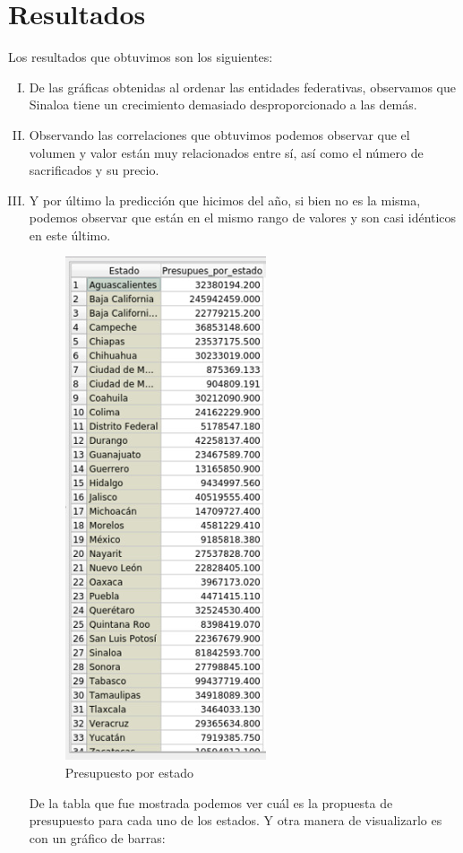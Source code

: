 \section*{Resultados}
Los resultados que obtuvimos son los siguientes:
\begin{enumerate}[I.]
    \item De las gráficas obtenidas al ordenar las entidades federativas, observamos que Sinaloa tiene un crecimiento demasiado desproporcionado a las demás.
    \item Observando las correlaciones que obtuvimos podemos observar que el volumen y valor están muy relacionados entre sí, así como el número de sacrificados y su precio. \newpage 
    \item Y por último la predicción que hicimos del año, si bien no es la misma, podemos observar que están en el mismo rango de valores y son casi idénticos en este último.
\begin{figure}[!h]
    \centering
    \includegraphics[width = 6 cm]{prep.jpeg}
    \caption{Presupuesto por estado}
    \label{diagrama}
\end{figure}
\newline
De la tabla que fue mostrada podemos ver cuál es la propuesta de presupuesto para cada uno de los estados. Y otra manera de visualizarlo es con un gráfico de barras: 

\end{enumerate}
